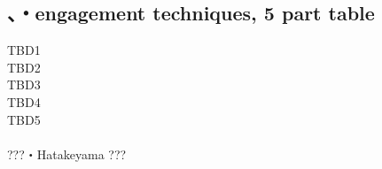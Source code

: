 \documentclass[dvipdfmx, a4paper, 12pt]{utarticle}
\begin{document}
\begin{CJK*}{UTF8}{min}
\begin{landscape}
\section{、・engagement techniques, 5 part table}
\noindent TBD1\\
TBD2\\
TBD3\\
TBD4\\
TBD5\\
\\
???・Hatakeyama ???

\end{landscape}
\end{CJK*}
\end{document}
